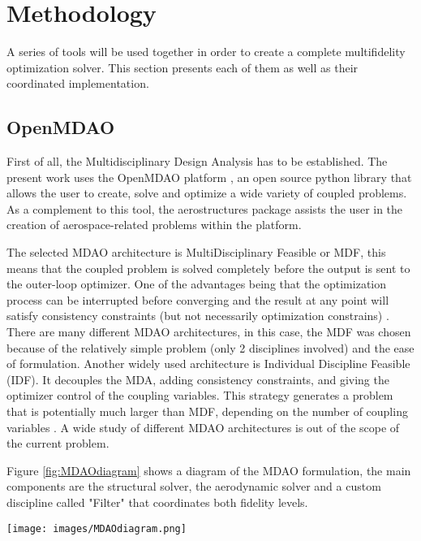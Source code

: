 \documentclass[conf]{new-aiaa}
\begin{document}
\section{Methodology}
\label{sec:methodology}
A series of tools will be used together in order to create a complete multifidelity optimization solver. This section presents each of them as well as their coordinated implementation. 

\subsection{OpenMDAO}
First of all, the Multidisciplinary Design Analysis has to be established. The present work uses the OpenMDAO platform \cite{openmdao_2019}, an open source python library that allows the user to create, solve and optimize a wide variety of coupled problems. As a complement to this tool, the aerostructures package \cite{mascolomer:tel-02023612} assists the user in the creation of aerospace-related problems within the platform. \par The selected MDAO architecture is MultiDisciplinary Feasible or MDF, this means that the coupled problem is solved completely before the output is sent to the outer-loop optimizer. One of the advantages being that the optimization process can be interrupted before converging and the result at any point will satisfy consistency constraints (but not necessarily optimization constrains) \cite{gray2013standard}. There are many different MDAO architectures, in this case, the MDF was chosen because of the relatively simple problem (only 2 disciplines involved) and the ease of formulation. Another widely used architecture is Individual Discipline Feasible (IDF). It decouples the MDA, adding consistency constraints, and giving the optimizer control  of the coupling variables. This strategy generates a problem that is potentially much larger than MDF, depending on the number of coupling variables \cite{gray2013standard}. A wide study of different MDAO architectures is out of the scope of the current problem. \par
Figure \ref{fig:MDAOdiagram} shows a diagram of the MDAO formulation, the main components are the structural solver, the aerodynamic solver and a custom discipline called "Filter" that coordinates both fidelity levels. 


\begin{figure*}[htpb]
    \centering
    \texttt{[image: images/MDAOdiagram.png]}
    \caption{MDAO diagram of the coupled multifidelity problem}
    \label{fig:MDAOdiagram}
\end{figure*}
\end{document}
